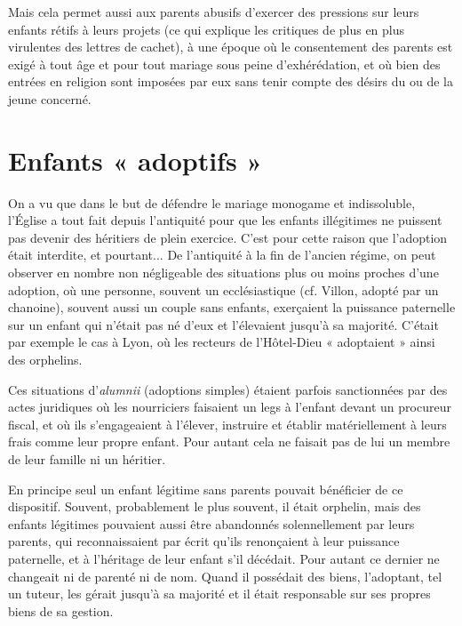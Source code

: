  Mais cela permet aussi aux parents abusifs d'exercer des pressions sur leurs enfants rétifs à leurs projets (ce qui explique les critiques de plus en plus virulentes des lettres de cachet), à une époque où le consentement des parents est exigé à tout âge et pour tout mariage sous peine d'exhérédation, et où bien des entrées en religion sont imposées par eux sans tenir compte des désirs du ou de la jeune concerné. 

\section{Enfants « adoptifs »}

 On a vu que dans le but de défendre le mariage monogame et indissoluble, l'Église a tout fait depuis l'antiquité pour que les enfants illégitimes ne puissent pas devenir des héritiers de plein exercice. C'est pour cette raison que l'adoption était interdite, et pourtant... De l'antiquité à la fin de l'ancien régime, on peut observer en nombre non négligeable des situations plus ou moins proches d'une adoption, où une personne, souvent un ecclésiastique (cf. \hbox{Villon}, adopté par un chanoine), souvent aussi un couple sans enfants, exerçaient la puissance paternelle sur un enfant qui n'était pas né d'eux et l'élevaient jusqu'à sa majorité. C'était par exemple le cas à Lyon, où les recteurs de l'Hôtel-Dieu « adoptaient » ainsi des orphelins. 

 Ces situations d'\emph{alumnii} (adoptions simples) étaient parfois sanctionnées par des actes juridiques où les nourriciers faisaient un legs à l'enfant devant un procureur fiscal, et où ils s'engageaient à l'élever, instruire et établir matériellement à leurs frais comme leur propre enfant. Pour autant cela ne faisait pas de lui un membre de leur famille ni un héritier. 

 En principe seul un enfant légitime sans parents pouvait bénéficier de ce dispositif. Souvent, probablement le plus souvent, il était orphelin, mais des enfants légitimes pouvaient aussi être abandonnés solennellement par leurs parents, qui reconnaissaient par écrit qu'ils renonçaient à leur puissance paternelle, et à l'héritage de leur enfant s'il décédait. Pour autant ce dernier ne changeait ni de parenté ni de nom. Quand il possédait des biens, l'adoptant, tel un tuteur, les gérait jusqu'à sa majorité et il était responsable sur ses propres biens de sa gestion. 


